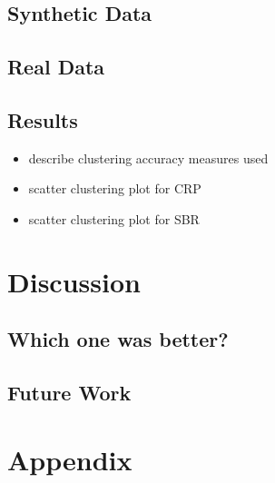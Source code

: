 \documentclass{article}
\begin{document}
\subsection{Synthetic Data}

\subsection{Real Data}

\subsection{Results}
\begin{itemize}
	\item describe clustering accuracy measures used
	\item scatter clustering plot for CRP
	\item scatter clustering plot for SBR
\end{itemize}


\section{Discussion}

\subsection{Which one was better?}
\subsection{Future Work}



{\footnotesize


}

\section{Appendix}
\end{document}
